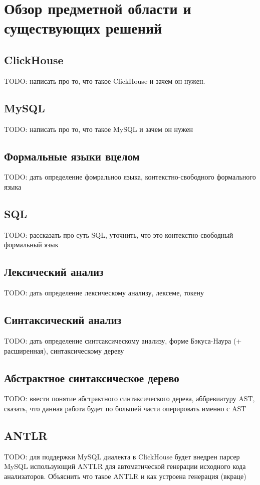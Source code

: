 \section{Обзор предметной области и существующих решений}
\subsection{ClickHouse}
TODO: написать про то, что такое ClickHouse и зачем он нужен.

\subsection{MySQL}
TODO: написать про то, что такое MySQL и зачем он нужен

\subsection{Формальные языки вцелом}
TODO: дать определение фомральноо языка, контекстно-свободного формального языка

\subsection{SQL}
TODO: рассказать про суть SQL, уточнить, что это контекстно-свободный формальный язык

\subsection{Лексический анализ}
TODO: дать определение лексическому анализу, лексеме, токену

\subsection{Синтаксический анализ}
TODO: дать определение синтсаксическому анализу, форме Бэкуса-Наура (+ расширенная), синтаксическому дереву

\subsection{Абстрактное синтаксическое дерево}
TODO: ввести понятие абстрактного синтаксического дерева, аббревиатуру AST, сказать, что данная работа будет по большей части оперировать именно с AST

\subsection{ANTLR}
TODO: для поддержки MySQL диалекта в ClickHouse будет внедрен парсер MySQL использующий ANTLR для автоматической генерации исходного кода анализаторов. Объяснить что такое ANTLR и как устроена генерация (вкраце)

